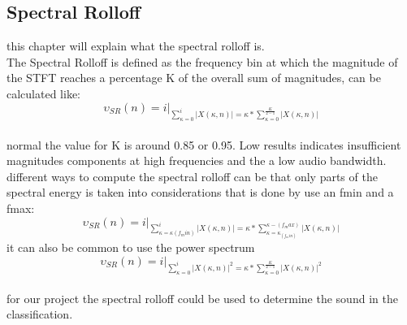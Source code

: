 \subsection{Spectral Rolloff}
this chapter will explain what the spectral rolloff is.\\
The Spectral Rolloff is defined as the frequency bin at which the magnitude of the STFT reaches a percentage K of the overall sum of magnitudes, can be calculated like:\\
\begin{equation}\label{ eq:normal spectral rolloff}
	\upsilon_{SR}(n) = i \vert _{\displaystyle\sum_{\kappa = 0}^i \vert X(\kappa, n) \vert = \kappa * \displaystyle\sum_{\kappa = 0}^ {\frac{K}{2-1}}\vert X(\kappa, n) \vert}
\end{equation}
\\
normal the value for K is around 0.85 or 0.95. Low results indicates insufficient magnitudes components at high frequencies and the a low audio bandwidth.\\
different ways to compute the spectral rolloff can be that only parts of the spectral energy is taken into considerations that is done by use an fmin and a fmax:
\begin{equation}\label{ eq: fmin and fmax spectral rolloff}
	\upsilon_{SR}(n) = i \vert _{\displaystyle\sum_{\kappa = \kappa(f_min)}^i \vert X(\kappa, n) \vert = \kappa * \displaystyle\sum_{\kappa = \kappa_(f_min)}^ {\kappa-(f_max)}\vert X(\kappa, n) \vert}
\end{equation}
it can also be common to use the power spectrum
\begin{equation}\label{ eq:power spectral rolloff}
	\upsilon_{SR}(n) = i \vert _{\displaystyle\sum_{\kappa = 0}^i \vert X(\kappa, n) \vert^2 = \kappa * \displaystyle\sum_{\kappa = 0}^ {\frac{K}{2-1}}\vert X(\kappa, n) \vert^2}
\end{equation}
\\
for our project the spectral rolloff could be used to determine the sound in the classification. 

